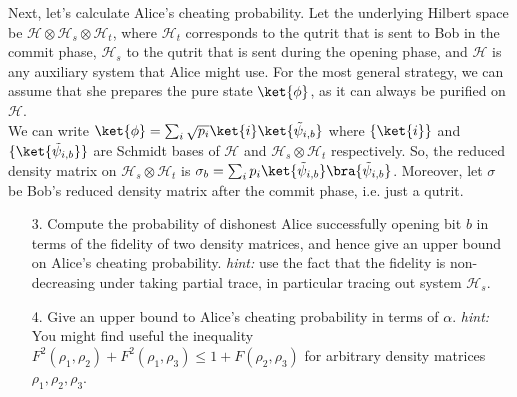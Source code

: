 \begin{exercises}
\begin{enumerate}
\end{enumerate}
Next, let's calculate Alice's cheating probability. Let the underlying Hilbert space be $\mathcal{H} \otimes \mathcal{H}_s \otimes \mathcal{H}_t$, where $\mathcal{H}_t$ corresponds to the qutrit that is sent to Bob in the commit phase, $\mathcal{H}_s$ to the qutrit that is sent during the opening phase, and $\mathcal{H}$ is any auxiliary system that Alice might use. For the most general strategy, we can assume that she prepares the pure state $\ket{\phi}$, as it can always be purified on $\mathcal{H}$.\\
We can write  $\ket{\phi} = \sum_{i} \sqrt{p_i} \ket{i} \ket{\tilde{\psi}_{i,b}}$ where $\{\ket{i}\}$ and $\{\ket{\tilde{\psi}_{i,b}}\}$ are Schmidt bases of $\mathcal{H}$ and $\mathcal{H}_s \otimes \mathcal{H}_t$ respectively. So, the reduced density matrix on $\mathcal{H}_s \otimes \mathcal{H}_t$ is $\sigma_b = \sum_{i} p_i  \ket{\tilde{\psi}_{i,b}} \bra{\tilde{\psi}_{i,b}} $. Moreover, let $\sigma$ be Bob's reduced density matrix after the commit phase, i.e. just a qutrit.
\begin{enumerate}
\item[3.] Compute the probability of dishonest Alice successfully opening bit $b$ in terms of the fidelity of two density matrices, and hence give an upper bound on Alice's cheating probability. \textit{hint:} use the fact that the fidelity is non-decreasing under taking partial trace, in particular tracing out system $\mathcal{H}_s$.
\item[4.] Give an upper bound to Alice's cheating probability in terms of $\alpha$. \textit{hint:} You might find useful the inequality $F^2(\rho_1,\rho_2) + F^2(\rho_1,\rho_3) \leq 1+ F(\rho_2,\rho_3) $ for arbitrary density matrices $\rho_1,\rho_2, \rho_3$.

\end{enumerate}
\end{exercises}
